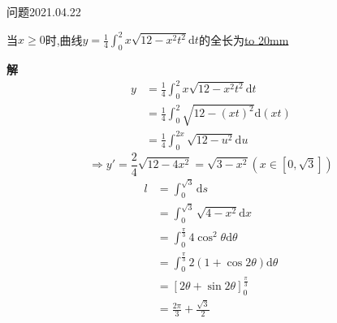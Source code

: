 \begin{mybox}{问题2021.04.22}
	
	\qquad 当$x\ge 0$时,曲线$y=\frac{1}{4}\int_{0}^{2}x\sqrt{12-x^2t^2}\mathrm{d}t$的全长为\underline{\hbox to 20mm{}}
\end{mybox}
\noindent
\textbf{解}
\begin{align*}
	y&=\frac{1}{4}\int_{0}^{2}x\sqrt{12-x^2t^2}\mathrm{d}t\\
	 &=\frac{1}{4}\int_{0}^{2}\sqrt{12-(xt)^2}\mathrm{d}(xt)\\
	 &=\frac{1}{4}\int_{0}^{2x}\sqrt{12-u^2}\mathrm{d}u
\end{align*}
$$\Rightarrow y'=\frac{2}{4}\sqrt{12-4x^2}=\sqrt{3-x^2}(x\in [0,\sqrt{3}])$$
\begin{align*}
	l&=\int_{0}^{\sqrt{3}}\mathrm{d}s\\
	 &=\int_{0}^{\sqrt{3}}\sqrt{4-x^2} \mathrm{d}x\\
	 &=\int_{0}^{\frac{\pi}{3}}4\cos^{2}\theta\mathrm{d}\theta\\
	 &=\int_{0}^{\frac{\pi}{3}}2(1+\cos{2\theta})\mathrm{d}\theta\\
	 &=[2\theta + \sin{2\theta}]_{0}^{\frac{\pi}{3}}\\
	 &=\frac{2\pi}{3}+\frac{\sqrt{3}}{2}
\end{align*}